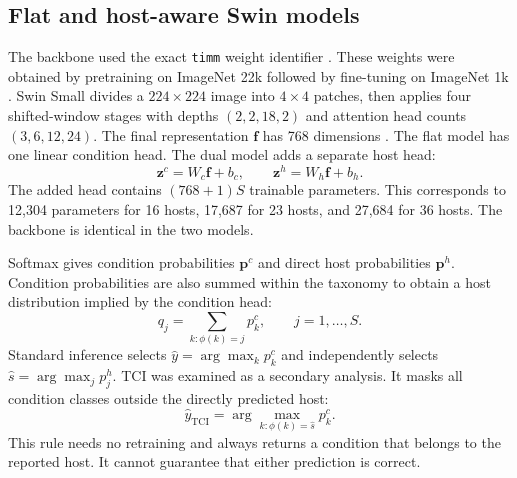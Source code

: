 \documentclass[preprint,12pt]{elsarticle}
\begin{document}
\subsection{Flat and host-aware Swin models}
\label{sec:model}

The backbone used the exact \texttt{timm} weight identifier
. These weights were
obtained by pretraining on ImageNet 22k followed by fine-tuning on ImageNet 1k
\cite{russakovsky2015}. Swin Small divides a $224\times224$ image into
$4\times4$ patches, then applies four shifted-window stages with depths
$(2,2,18,2)$ and attention head counts $(3,6,12,24)$. The final representation
$\mathbf f$ has 768 dimensions \cite{liu2021swin}. The flat model has one
linear condition head. The dual model adds a separate host head:
\begin{equation}
 \mathbf z^c=W_c\mathbf f+b_c,\qquad
 \mathbf z^h=W_h\mathbf f+b_h.
\end{equation}
The added head contains $(768+1)S$ trainable parameters. This corresponds to
12,304 parameters for 16 hosts, 17,687 for 23 hosts, and 27,684 for 36 hosts.
The backbone is identical in the two models.

Softmax gives condition probabilities $\mathbf p^c$ and direct host
probabilities $\mathbf p^h$. Condition probabilities are also summed within the
taxonomy to obtain a host distribution implied by the condition head:
\begin{equation}
 q_j=\sum_{k:\phi(k)=j}p^c_k,\qquad j=1,\ldots,S.
 \label{eq:aggregation}
\end{equation}
Standard inference selects $\hat y=\arg\max_k p^c_k$ and independently selects
$\hat s=\arg\max_j p^h_j$. TCI was examined as a secondary analysis. It masks
all condition classes outside the directly predicted host:
\begin{equation}
 \hat y_{\mathrm{TCI}}=\arg\max_{k:\phi(k)=\hat s}p^c_k.
 \label{eq:tci}
\end{equation}
This rule needs no retraining and always returns a condition that belongs to the
reported host. It cannot guarantee that either prediction is correct.
\end{document}
